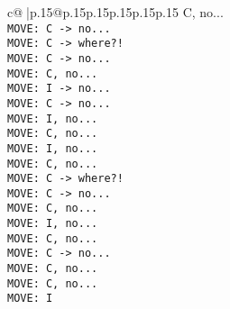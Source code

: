 \documentclass{article}
\begin{document}
{\begin{supertabular}{c@{$\;$}|p{.15\linewidth}@{}p{.15\linewidth}p{.15\linewidth}p{.15\linewidth}p{.15\linewidth}p{.15\linewidth}}
{{{ C, no...\\ \tt  MOVE: C -> no...\\ \tt  MOVE: C -> where?!\\ \tt  MOVE: C -> no...\\ \tt  MOVE: C, no...\\ \tt  MOVE: I -> no...\\ \tt  MOVE: C -> no...\\ \tt  MOVE: I, no...\\ \tt  MOVE: C, no...\\ \tt  MOVE: I, no...\\ \tt  MOVE: C, no...\\ \tt  MOVE: C -> where?!\\ \tt  MOVE: C -> no...\\ \tt  MOVE: C, no...\\ \tt  MOVE: I, no...\\ \tt  MOVE: C, no...\\ \tt  MOVE: C -> no...\\ \tt  MOVE: C, no...\\ \tt  MOVE: C, no...\\ \tt  MOVE: I }}}
\end{supertabular}}
\end{document}
